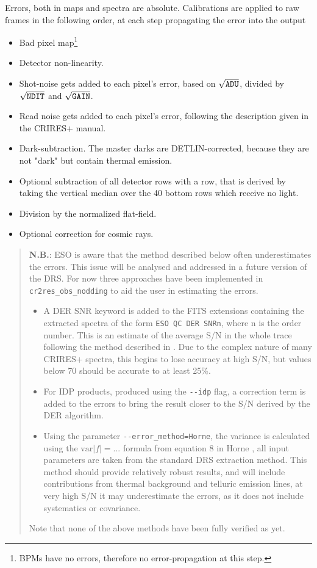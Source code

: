 Errors, both in maps and spectra are absolute. Calibrations are applied to raw
frames in the following order, at each step propagating the error into the
output
\begin{itemize}
    \item Bad pixel map\footnote{BPMs have no errors, therefore no
    error-propagation at this step.}
    \item Detector non-linearity.
    \item Shot-noise gets added to each pixel's error, based on
    $\sqrt{\verb!ADU!}$, divided by $\sqrt{\verb!NDIT!}$ and
    $\sqrt{\verb!GAIN!}$.
    \item Read noise gets added to each pixel's error, following the description
    given in the CRIRES+ manual.
    \item Dark-subtraction. The master darks are DETLIN-corrected, because they
    are not "dark" but contain thermal emission.
    \item Optional subtraction of all detector rows with a row, that is derived
    by taking the vertical median over the 40 bottom rows which receive no
    light.
    \item Division by the normalized flat-field.
    \item Optional correction for cosmic rays.
\end{itemize}

\begin{quote}

\textbf{N.B.}: ESO is aware that the method described below often underestimates the errors.
This issue will be analysed and addressed in a future version of the DRS. For now
three approaches have been implemented in \verb!cr2res_obs_nodding! to aid the user in estimating the errors.
\begin{itemize}
    \item A DER SNR keyword is added to the FITS extensions containing the extracted spectra
    of the form \verb!ESO QC DER SNRn!, where n is the order number.
    This is an estimate of the average S/N in the whole trace following the method described in 
    \cite{2008ASPC..394..505S}. Due to the complex nature of many CRIRES+ spectra, this begins to
    lose accuracy at high S/N, but values below 70 should be accurate to at least 25\%. 
    \item For IDP products, produced using the \verb!--idp! flag, a correction term is added to the errors
    to bring the result closer to the S/N derived by the DER algorithm.
    \item Using the parameter \verb!--error_method=Horne!, the variance is calculated using the $\textrm{var}\left| f \right|=$...  
    formula from equation 8 in Horne \cite{1986PASP...98..609H}, all input parameters are taken from the standard
    DRS extraction method. This method should provide relatively robust results, and will include contributions 
    from thermal background and telluric emission lines, at very high S/N it may underestimate the errors, as
    it does not include systematics or covariance.
\end{itemize} 
Note that none of the above methods have been fully verified as yet.
\end{quote}

